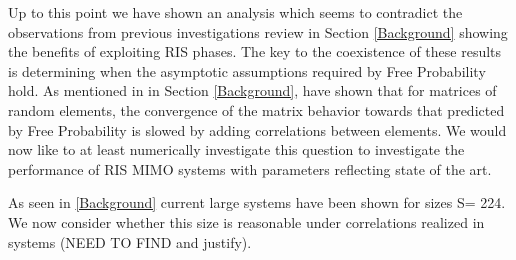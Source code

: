 Up to this point we have shown an analysis which seems to contradict the observations from previous investigations review in Section \ref{Background} showing the benefits of exploiting RIS phases. The key to the coexistence of these results is determining when the asymptotic assumptions required by Free Probability hold. 
As mentioned in in Section \ref{Background}, \cite {} have shown that for matrices of random elements, the  convergence of the matrix behavior towards that predicted by Free Probability is slowed by adding correlations between elements. We would now like to at least numerically investigate this question to investigate the performance of RIS MIMO systems with parameters reflecting state of the art.


 As seen in \ref{Background} current large systems have been shown for 
sizes S= 224. We now consider whether this size is reasonable under correlations realized in systems (NEED TO FIND and justify). 
